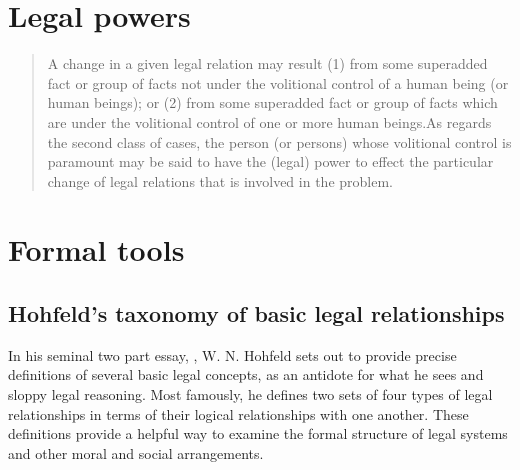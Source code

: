 \section{Legal powers}\label{sec:legal-powers}
\begin{quote}
  A change in a given legal relation may result (1) from some superadded fact or
  group of facts not under the volitional control of a human being (or human
  beings); or (2) from some superadded fact or group of facts which are under the
  volitional control of one or more human beings.As regards the second class of
  cases, the person (or persons) whose volitional control is paramount may be said
  to have the (legal) power to effect the particular change of legal relations
  that is involved in the problem.
\citep[44]{hohfeldfundamentallegal1913}


\end{quote}

\section{Formal tools}\label{sec:formal-tools}

\subsection{Hohfeld's taxonomy of basic legal relationships}\label{sec:hohf-taxon}
In his seminal two part essay, , W.
N. Hohfeld \citep{hohfeldfundamentallegal1913,hohfeldfundamentallegal1917} sets
out to provide precise definitions of several basic legal concepts, as an
antidote for what he sees and sloppy legal reasoning.
Most famously, he defines two sets of four types of legal relationships in terms
of their logical relationships with one another.
These definitions provide a helpful way to examine the formal structure of legal
systems and other moral and social arrangements.

